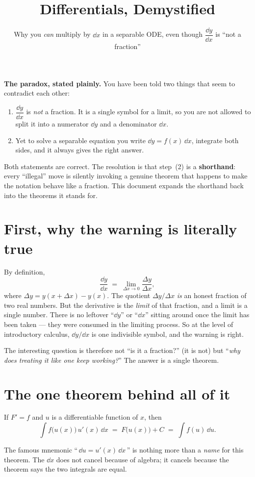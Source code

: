 \documentclass{essay}
\title{Differentials, Demystified}
\subtitle{Why you \emph{can} multiply by \(\dd x\) in a separable ODE,
even though \(\dfrac{\dd y}{\dd x}\) is ``not a fraction''}
\author{}
\date{}
\newcommand{\ddx}[1]{\frac{\dd #1}{\dd x}}
\begin{document}
\maketitle

\textbf{The paradox, stated plainly.}
You have been told two things that seem to contradict each other:
\begin{enumerate}[label=\textbf{(\arabic*)}]
  \item \(\dfrac{\dd y}{\dd x}\) is \emph{not} a fraction. It is a
    single symbol for a limit, so you are not allowed to split it
    into a numerator \(\dd y\) and a denominator \(\dd x\).
  \item Yet to solve a separable equation you write \(\dd y =
    f(x)\,\dd x\), integrate both sides, and it always gives the right answer.
\end{enumerate}
Both statements are correct. The resolution is that step~(2) is a
\textbf{shorthand}: every ``illegal'' move is silently invoking a
genuine theorem that happens to make the notation behave like a
fraction. This document expands the shorthand back into the
theorems it stands for.

\section{First, why the warning is literally true}

By definition,
\[ \ddx{y} \;=\; \lim_{\Delta x \to 0}\frac{\Delta y}{\Delta x}, \]
where \(\Delta y = y(x+\Delta x) - y(x)\). The quotient \(\Delta y /
\Delta x\) \emph{is} an honest fraction of two real numbers. But the
derivative is the \emph{limit} of that fraction, and a limit is a
single number. There is no leftover ``\(\dd y\)'' or ``\(\dd x\)''
sitting around once the limit has been taken --- they were consumed
in the limiting process. So at the level of introductory calculus,
\(\dd y/\dd x\) is one indivisible symbol, and the warning is right.

The interesting question is therefore not ``is it a fraction?'' (it
is not) but ``\emph{why does treating it like one keep working?}''
The answer is a single theorem.

\section{The one theorem behind all of it}

\begin{theorem}
  If \(F' = f\) and \(u\) is a differentiable function of \(x\), then
  \[ \int f\bigl(u(x)\bigr)\,u'(x)\,\dd x \;=\; F\bigl(u(x)\bigr)+C \;=\; \int f(u)\,\dd u . \]
\end{theorem}
The famous mnemonic ``\,\(\dd u = u'(x)\,\dd x\)\,'' is nothing more
than a \emph{name} for this theorem. The \(\dd x\) does not cancel
because of algebra; it cancels because the theorem says the two
integrals are equal.
\end{document}
